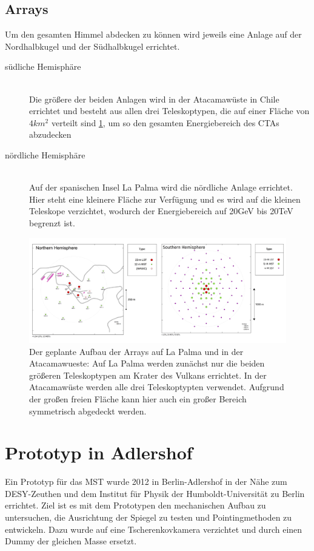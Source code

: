 \subsection{Arrays}
Um den gesamten Himmel abdecken zu können wird jeweils eine Anlage auf der Nordhalbkugel und der Südhalbkugel errichtet.
\begin{description}
\item[südliche Hemisphäre]\hfill \\
Die größere der beiden Anlagen wird in der Atacamawüste in Chile errichtet und besteht aus allen drei Teleskoptypen, die auf einer Fläche von $4km^2$ verteilt sind \ref{img:ArrayLayout}, um so den gesamten Energiebereich des CTAs abzudecken
\item[nördliche Hemisphäre]\hfill \\ 
Auf der spanischen Insel La Palma wird die nördliche Anlage errichtet. Hier steht eine kleinere Fläche zur Verfügung und es wird auf die kleinen Teleskope verzichtet, wodurch der Energiebereich auf 20GeV bis 20TeV begrenzt ist.
\end{description}

\begin{figure}[htbp]
\centering
\includegraphics[width=\textwidth]{Images/ArrayLayout.png}
\caption{Der geplante Aufbau der Arrays auf La Palma und in der Atacamawueste: Auf La Palma werden zunächst nur die beiden größeren Teleskoptypen am Krater des Vulkans errichtet. In der Atacamawüste werden alle drei Teleskoptypten verwendet. Aufgrund der großen freien Fläche kann hier auch ein großer Bereich symmetrisch abgedeckt werden.}
\label{img:ArrayLayout}
\end{figure}

\section{Prototyp in Adlershof}
Ein Prototyp für das MST wurde 2012 in Berlin-Adlershof in der Nähe zum DESY-Zeuthen und dem Institut für Physik der Humboldt-Universität zu Berlin errichtet. Ziel ist es mit dem Prototypen den mechanischen Aufbau zu untersuchen, die Ausrichtung der Spiegel zu testen und Pointingmethoden zu entwickeln. Dazu wurde auf eine Tscherenkovkamera verzichtet und durch einen Dummy der gleichen Masse ersetzt.

